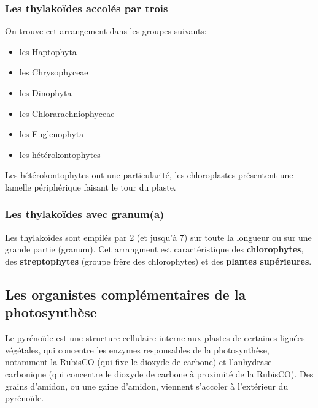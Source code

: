 \documentclass[
]{book}
\providecommand{\tightlist}{%
  \setlength{\itemsep}{0pt}\setlength{\parskip}{0pt}}
\begin{document}
\hypertarget{les-thylakouxefdes-accoluxe9s-par-trois}{%
\subsubsection{Les thylakoïdes accolés par trois}\label{les-thylakouxefdes-accoluxe9s-par-trois}}

On trouve cet arrangement dans les groupes suivants:

\begin{itemize}
\tightlist
\item
  les Haptophyta
\item
  les Chrysophyceae
\item
  les Dinophyta
\item
  les Chlorarachniophyceae
\item
  les Euglenophyta
\item
  les hétérokontophytes
\end{itemize}

Les hétérokontophytes ont une particularité, les chloroplastes présentent une lamelle périphérique faisant le tour du plaste.

\hypertarget{les-thylakouxefdes-avec-granuma}{%
\subsubsection{Les thylakoïdes avec granum(a)}\label{les-thylakouxefdes-avec-granuma}}

Les thylakoïdes sont empilés par 2 (et jusqu'à 7) sur toute la longueur ou sur une grande partie (granum). Cet arrangment est caractéristique des \textbf{chlorophytes}, des \textbf{streptophytes} (groupe frère des chlorophytes) et des \textbf{plantes supérieures}.

\hypertarget{les-organistes-compluxe9mentaires-de-la-photosynthuxe8se}{%
\subsection{Les organistes complémentaires de la photosynthèse}\label{les-organistes-compluxe9mentaires-de-la-photosynthuxe8se}}

Le pyrénoïde est une structure cellulaire interne aux plastes de certaines lignées végétales, qui concentre les enzymes responsables de la photosynthèse, notamment la RubisCO (qui fixe le dioxyde de carbone) et l'anhydrase carbonique (qui concentre le dioxyde de carbone à proximité de la RubisCO). Des grains d'amidon, ou une gaine d'amidon, viennent s'accoler à l'extérieur du pyrénoïde.
\end{document}
